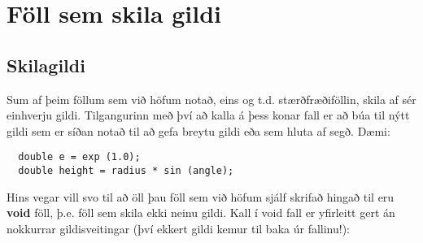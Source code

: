 





\chapter{Föll sem skila gildi}

\section{Skilagildi}

Sum af þeim föllum sem við höfum notað, eins og t.d. stærðfræðiföllin, skila af sér einhverju gildi.
Tilgangurinn með því að kalla á þess konar fall er að búa til nýtt gildi sem er síðan notað til að gefa breytu gildi eða sem hluta af segð.
Dæmi:


\begin{verbatim}
  double e = exp (1.0);
  double height = radius * sin (angle);
\end{verbatim}
%
Hins vegar vill svo til að öll þau föll sem við höfum sjálf skrifað hingað til eru {\bf void} föll, þ.e. föll sem skila ekki neinu gildi.
Kall í void fall er yfirleitt gert án nokkurrar gildisveitingar (því ekkert gildi kemur til baka úr fallinu!):

